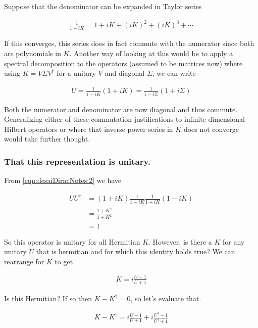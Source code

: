 Suppose that the denominator can be expanded in Taylor series

\begin{align*}
\frac{1}{1-iK} = 1 + iK + (iK)^2 + (iK)^3 + \cdots
\end{align*}

If this converges, this series does in fact commute with the numerator since both are polynomials in $K$.  Another way of looking at this would be to apply a spectral decomposition to the operators (assumed to be matrices now) where using $K = V \Sigma V^\dagger$ for a unitary $V$ and diagonal $\Sigma$, we can write

\begin{align*}
U = \frac{1}{1-iK}(1 + iK) = \frac{1}{1-i \Sigma}(1 + i \Sigma)
\end{align*}

Both the numerator and denominator are now diagonal and thus commute.  Generalizing either of these commutation justifications to infinite dimensional Hilbert operators or where that inverse power series in $K$ does not converge would take further thought.

\subsubsection{That this representation is unitary.}

From \ref{eqn:desaiDiracNotes:2} we have

\begin{align*}
U U^\dagger 
&= (1 + iK)\frac{1}{1-iK} \frac{1}{1+iK} (1 - iK) \\
&= \frac{1 + K^2}{1+K^2} \\
&= 1
\end{align*}

So this operator is unitary for all Hermitian $K$.  However, is there a $K$ for any unitary $U$ that is hermitian and for which this identity holds true?  We can rearrange for $K$ to get

\begin{align}\label{eqn:desaiDiracNotes:3}
K = i \frac{ U - 1 }{U + 1}
\end{align}

Is this Hermitian?  If so then $K - K^\dagger = 0$, so let's evaluate that.

\begin{align*}
K - K^\dagger = i \frac{ U - 1 }{U + 1} + i \frac{ U^\dagger - 1 }{U^\dagger + 1}
\end{align*}

